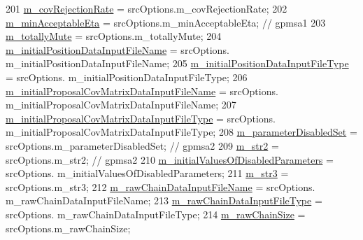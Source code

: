 \begin{DoxyCode}
201   \hyperlink{class_q_u_e_s_o_1_1_m_l_sampling_level_options_a8efaf9dfed7ff9f87c9a40aa8e8217a8}{m\_covRejectionRate}                          = srcOptions.m\_covRejectionRate;
202   \hyperlink{class_q_u_e_s_o_1_1_m_l_sampling_level_options_a8230c7dd67833668237d3dc5b19c53c5}{m\_minAcceptableEta}                          = srcOptions.m\_minAcceptableEta; \textcolor{comment}{// gpmsa1}
203   \hyperlink{class_q_u_e_s_o_1_1_m_l_sampling_level_options_aeb5b3d634be08ac24bdc008ecfbf08b6}{m\_totallyMute}                               = srcOptions.m\_totallyMute;
204   \hyperlink{class_q_u_e_s_o_1_1_m_l_sampling_level_options_ac27dd9d3b5a376bfd146caa62fa32613}{m\_initialPositionDataInputFileName}          = srcOptions.
      m\_initialPositionDataInputFileName;
205   \hyperlink{class_q_u_e_s_o_1_1_m_l_sampling_level_options_a582573c99a718b1eefe417c0cccf071f}{m\_initialPositionDataInputFileType}          = srcOptions.
      m\_initialPositionDataInputFileType;
206   \hyperlink{class_q_u_e_s_o_1_1_m_l_sampling_level_options_aa2dd58cb7865577da082fde9f0b180cb}{m\_initialProposalCovMatrixDataInputFileName} = srcOptions.
      m\_initialProposalCovMatrixDataInputFileName;
207   \hyperlink{class_q_u_e_s_o_1_1_m_l_sampling_level_options_a6e6ea2f36afd7b6a6900eaf44165a796}{m\_initialProposalCovMatrixDataInputFileType} = srcOptions.
      m\_initialProposalCovMatrixDataInputFileType;
208   \hyperlink{class_q_u_e_s_o_1_1_m_l_sampling_level_options_a0c5c308a5b9e0150be59ad52a48e6ab9}{m\_parameterDisabledSet}                      = srcOptions.m\_parameterDisabledSet; \textcolor{comment}{//
       gpmsa2}
209   \hyperlink{class_q_u_e_s_o_1_1_m_l_sampling_level_options_ab91c7af5bfcfeb0466970713e2655e3a}{m\_str2}                                      = srcOptions.m\_str2; \textcolor{comment}{// gpmsa2}
210   \hyperlink{class_q_u_e_s_o_1_1_m_l_sampling_level_options_a50cbdab5fe9fbda97aca16d206888a18}{m\_initialValuesOfDisabledParameters}         = srcOptions.
      m\_initialValuesOfDisabledParameters;
211   \hyperlink{class_q_u_e_s_o_1_1_m_l_sampling_level_options_ab373068cdb371c781603dbb2b75ae14d}{m\_str3}                                      = srcOptions.m\_str3;
212   \hyperlink{class_q_u_e_s_o_1_1_m_l_sampling_level_options_a192498743c73fa9244c8652530beebb2}{m\_rawChainDataInputFileName}                 = srcOptions.
      m\_rawChainDataInputFileName;
213   \hyperlink{class_q_u_e_s_o_1_1_m_l_sampling_level_options_af216317de1aba551bfddd2be38e26898}{m\_rawChainDataInputFileType}                 = srcOptions.
      m\_rawChainDataInputFileType;
214   \hyperlink{class_q_u_e_s_o_1_1_m_l_sampling_level_options_a8ab85efacd9881ab35b9f01b6e4fc5a3}{m\_rawChainSize}                              = srcOptions.m\_rawChainSize;

\end{DoxyCode}
